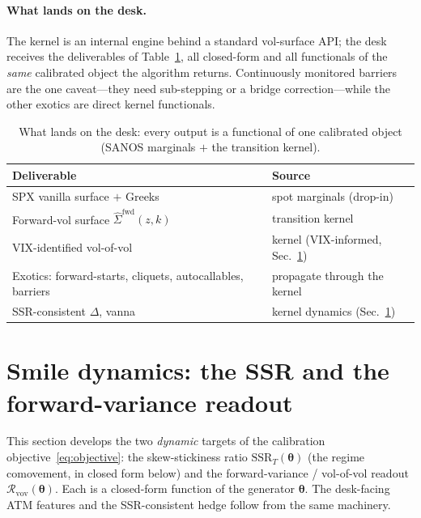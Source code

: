\documentclass[11pt]{article}
\newcommand{\cR}{\mathcal{R}}
\newcommand{\SSR}{\mathrm{SSR}}
\newcommand{\bth}{{\boldsymbol{\theta}}}
\begin{document}
\paragraph{What lands on the desk.}
The kernel is an internal engine behind a standard vol-surface API; the desk receives the
deliverables of Table~\ref{tab:desk}, all closed-form and all functionals of the \emph{same}
calibrated object the algorithm returns. Continuously monitored barriers are the one
caveat---they need sub-stepping or a bridge correction---while the other exotics are direct
kernel functionals.

\begin{table}[h]
\centering\small
\setlength{\tabcolsep}{5pt}
\caption{What lands on the desk: every output is a functional of one calibrated object (SANOS marginals $+$ the transition kernel).}
\label{tab:desk}
\begin{tabular}{ll}
\toprule
Deliverable & Source \\
\midrule
SPX vanilla surface $+$ Greeks & spot marginals (drop-in) \\
Forward-vol surface $\widehat\Sigma^{\mathrm{fwd}}(z,k)$ & transition kernel \\
VIX-identified vol-of-vol & kernel (VIX-informed, Sec.~\ref{sec:ssr}) \\
Exotics: forward-starts, cliquets, autocallables, barriers & propagate through the kernel \\
SSR-consistent $\Delta$, vanna & kernel dynamics (Sec.~\ref{sec:ssr}) \\
\bottomrule
\end{tabular}
\end{table}

\section{Smile dynamics: the SSR and the forward-variance readout}
\label{sec:ssr}

This section develops the two \emph{dynamic} targets of the calibration
objective~\eqref{eq:objective}: the skew-stickiness ratio $\SSR_T(\bth)$ (the regime
comovement, in closed form below) and the forward-variance / vol-of-vol readout
$\cR_{\mathrm{vov}}(\bth)$. Each is a closed-form function of the generator $\bth$. The
desk-facing ATM features and the SSR-consistent hedge follow from the same machinery.
\end{document}
